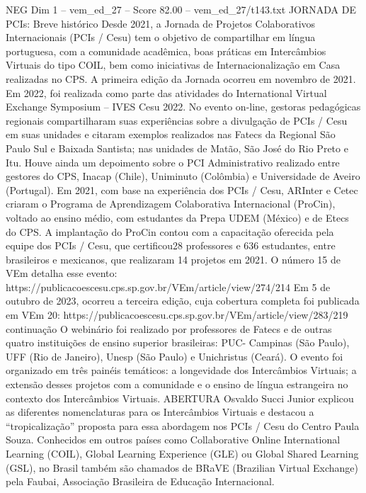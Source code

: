 \begin{textsample}{NEG Dim 1 – vem\_ed\_27 – Score 82.00 – vem\_ed\_27/t143.txt}  \label{ex:f1_neg_173}
JORNADA DE PCIs: Breve histórico Desde 2021, a Jornada de Projetos Colaborativos Internacionais (PCIs / Cesu) tem o objetivo de compartilhar em língua portuguesa, com a comunidade acadêmica, boas práticas em Intercâmbios Virtuais do tipo COIL, bem como iniciativas de Internacionalização em Casa realizadas no CPS.
A primeira edição da Jornada ocorreu em novembro de 2021.
Em 2022, foi realizada como parte das atividades do International Virtual Exchange Symposium – IVES Cesu 2022.
No evento on-line, gestoras pedagógicas regionais compartilharam suas experiências sobre a divulgação de PCIs / Cesu em suas unidades e citaram exemplos realizados nas Fatecs da Regional São Paulo Sul e Baixada Santista; nas unidades de Matão, São José do Rio Preto e Itu.
Houve ainda um depoimento sobre o PCI Administrativo realizado entre gestores do CPS, Inacap (Chile), Uniminuto (Colômbia) e Universidade de Aveiro (Portugal).
Em 2021, com base na experiência dos PCIs / Cesu, ARInter e Cetec criaram o Programa de Aprendizagem Colaborativa Internacional (ProCin), voltado ao ensino médio, com estudantes da Prepa UDEM (México) e de Etecs do CPS.
A implantação do ProCin contou com a capacitação oferecida pela equipe dos PCIs / Cesu, que certificou28 professores e 636 estudantes, entre brasileiros e mexicanos, que realizaram 14 projetos em 2021.
O número 15 de VEm detalha esse evento: https://publicacoescesu.cps.sp.gov.br/VEm/article/view/274/214 Em 5 de outubro de 2023, ocorreu a terceira edição, cuja cobertura completa foi publicada em VEm 20: https://publicacoescesu.cps.sp.gov.br/VEm/article/view/283/219 continuação O webinário foi realizado por professores de Fatecs e de outras quatro instituições de ensino superior brasileiras: PUC- Campinas (São Paulo), UFF (Rio de Janeiro), Unesp (São Paulo) e Unichristus (Ceará).
O evento foi organizado em três painéis temáticos: a longevidade dos Intercâmbios Virtuais; a extensão desses projetos com a comunidade e o ensino de língua estrangeira no contexto dos Intercâmbios Virtuais.
ABERTURA Osvaldo Succi Junior explicou as diferentes nomenclaturas para os Intercâmbios Virtuais e destacou a “tropicalização” proposta para essa abordagem nos PCIs / Cesu do Centro Paula Souza.
Conhecidos em outros países como Collaborative Online International Learning (COIL), Global Learning Experience (GLE) ou Global Shared Learning (GSL), no Brasil também são chamados de BRaVE (Brazilian Virtual Exchange) pela Faubai, Associação Brasileira de Educação Internacional.

\end{textsample}
